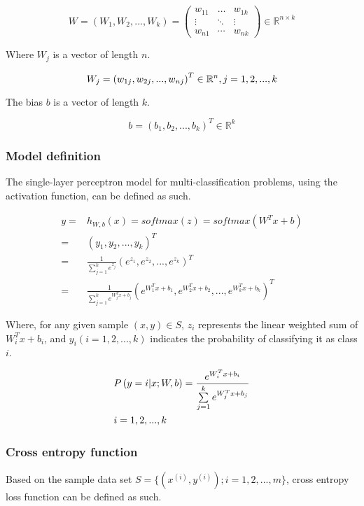 \begin{content}
\begin{content}
\[
W = \left( {{W_1},{W_2},...,{W_k}} \right) = \left( {\begin{array}{*{20}{c}}
  {{w_{11}}}& \ldots &{{w_{1k}}} \\ 
   \vdots & \ddots & \vdots  \\ 
  {{w_{n1}}}& \cdots &{{w_{nk}}} 
\end{array}} \right) \in {\mathbb{R}^{n \times k}}
\]

Where $W_j$ is a vector of length $n$.

\[
{W_j} = {\left( {{w_{1j}},{w_{2j}},...,{w_{nj}}} \right)^T} \in {\mathbb{R}^n}, j = 1,2,...,k \\
\]

The bias $b$ is a  vector of length $k$.

\[
b = {({b_1},{b_2},...,{b_k})^T} \in {\mathbb{R}^k}
\]


\subsubsection{Model definition}
The single-layer perceptron model for multi-classification problems, using the  activation function, can be defined as such.

\[\begin{aligned}
  y =  & {h_{W,b}}(x) = softmax (z) = softmax ({W^T}x + b) \\ 
   =  & {\left( {{y_1},{y_2},...,{y_k}} \right)^T} \\ 
   =  & \frac{1}{{\sum\limits_{j = 1}^k {{e^{{z_j}}}} }}{\left( {{e^{{z_1}}},{e^{{z_2}}},...,{e^{{z_k}}}} \right)^T} \\ 
   =  & \frac{1}{{\sum\limits_{j = 1}^k {{e^{W_j^Tx + {b_j}}}} }}{\left( {{e^{W_1^Tx + {b_1}}},{e^{W_2^Tx + {b_2}}},...,{e^{W_k^Tx + {b_k}}}} \right)^T} \ 
\end{aligned} \]

Where, for any given sample $ (x, y) \in S $, $ z_i $ represents the linear weighted sum of $W_i^Tx+b_i$, and $y_i(i=1,2,...,k )$ indicates the probability of classifying it as class $i$.

\[\begin{gathered}
  P\left( {y = i|x;W,b} \right) = \frac{{{e^{W_i^Tx + b_i}}}}{{\sum\limits_{j = 1}^k {{e^{W_j^Tx + b_j}}} }} \hfill \\
  i = 1,2,...,k \hfill \\ 
\end{gathered} \]


\subsubsection{Cross entropy function}
Based on the sample data set $ S = \{ ({x^{(i)}}, {y^{(i)}});i = 1,2,...,m\} $, cross entropy loss function can be defined as such.


\end{content}
\end{content}

